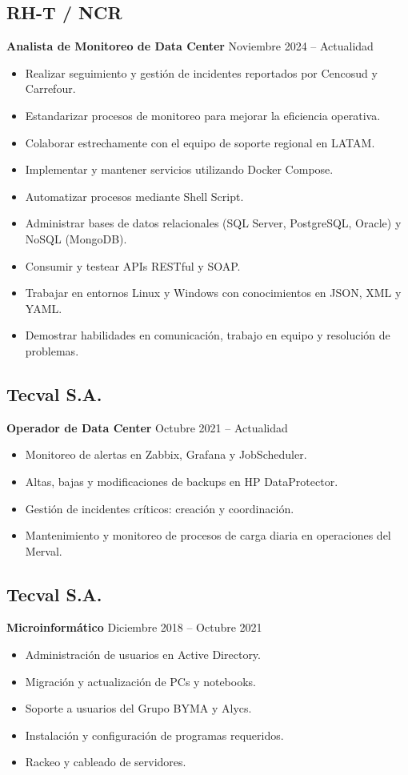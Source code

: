 \documentclass[a4paper,10pt]{article}
\begin{document}
\subsection*{\Large\textbf{RH-T / NCR}}
\textbf{\normalsize Analista de Monitoreo de Data Center} \hfill Noviembre 2024 – Actualidad
\begin{itemize}
	\item Realizar seguimiento y gestión de incidentes reportados por Cencosud y Carrefour.
	\item Estandarizar procesos de monitoreo para mejorar la eficiencia operativa.
	\item Colaborar estrechamente con el equipo de soporte regional en LATAM.
	\item Implementar y mantener servicios utilizando Docker Compose.
	\item Automatizar procesos mediante Shell Script.
	\item Administrar bases de datos relacionales (SQL Server, PostgreSQL, Oracle) y NoSQL (MongoDB).
	\item Consumir y testear APIs RESTful y SOAP.
	\item Trabajar en entornos Linux y Windows con conocimientos en JSON, XML y YAML.
	\item Demostrar habilidades en comunicación, trabajo en equipo y resolución de problemas.
\end{itemize}

\subsection*{\Large\textbf{Tecval S.A.}}
\textbf{\normalsize Operador de Data Center} \hfill Octubre 2021 – Actualidad
\begin{itemize}
	\item Monitoreo de alertas en Zabbix, Grafana y JobScheduler.
	\item Altas, bajas y modificaciones de backups en HP DataProtector.
	\item Gestión de incidentes críticos: creación y coordinación.
	\item Mantenimiento y monitoreo de procesos de carga diaria en operaciones del Merval.
\end{itemize}

\subsection*{\Large\textbf{Tecval S.A.}}
\textbf{\normalsize Microinformático} \hfill Diciembre 2018 – Octubre 2021
\begin{itemize}
	\item Administración de usuarios en Active Directory.
	\item Migración y actualización de PCs y notebooks.
	\item Soporte a usuarios del Grupo BYMA y Alycs.
	\item Instalación y configuración de programas requeridos.
	\item Rackeo y cableado de servidores.
\end{itemize}
\end{document}
